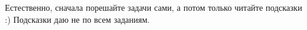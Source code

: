 
\cleardoublepage
{}
Естественно, сначала порешайте задачи сами, а потом только читайте подсказки :) Подсказки даю не по всем заданиям.






                                                                                                                            


